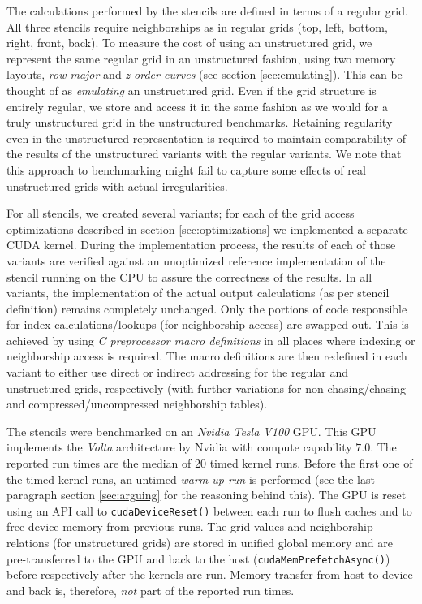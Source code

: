 The calculations performed by the stencils are defined in terms of a regular grid. All three stencils require neighborships as in regular grids (top, left, bottom, right, front, back). To measure the cost of using an unstructured grid, we represent the same regular grid in an unstructured fashion, using two memory layouts, \emph{row-major} and \emph{z-order-curves} (see section \ref{sec:emulating}). This can be thought of as \emph{emulating} an unstructured grid. Even if the grid structure is entirely regular, we store and access it in the same fashion as we would for a truly unstructured grid in the unstructured benchmarks. Retaining regularity even in the unstructured representation is required to maintain comparability of the results of the unstructured variants with the regular variants. We note that this approach to benchmarking might fail to capture some effects of real unstructured grids with actual irregularities.

For all stencils, we created several variants; for each of the grid access optimizations described in section \ref{sec:optimizations} we implemented a separate CUDA kernel. During the implementation process, the results of each of those variants are verified against an unoptimized reference implementation of the stencil running on the CPU to assure the correctness of the results. In all variants, the implementation of the actual output calculations (as per stencil definition) remains completely unchanged. Only the portions of code responsible for index calculations/lookups (for neighborship access) are swapped out. This is achieved by using \emph{C preprocessor macro definitions} in all places where indexing or neighborship access is required. The macro definitions are then redefined in each variant to either use direct or indirect addressing for the regular and unstructured grids, respectively (with further variations for non-chasing/chasing and compressed/uncompressed neighborship tables).

The stencils were benchmarked on an \emph{Nvidia Tesla V100} GPU. This GPU implements the \emph{Volta} architecture by Nvidia with compute capability $7.0$. The reported run times are the median of 20 timed kernel runs. Before the first one of the timed kernel runs, an untimed \emph{warm-up run} is performed (see the last paragraph section \ref{sec:arguing} for the reasoning behind this). The GPU is reset using an API call to \texttt{cudaDeviceReset()} between each run to flush caches and to free device memory from previous runs. The grid values and neighborship relations (for unstructured grids) are stored in unified global memory and are pre-transferred to the GPU and back to the host (\texttt{cudaMemPrefetchAsync()}) before respectively after the kernels are run. Memory transfer from host to device and back is, therefore, \emph{not} part of the reported run times.

